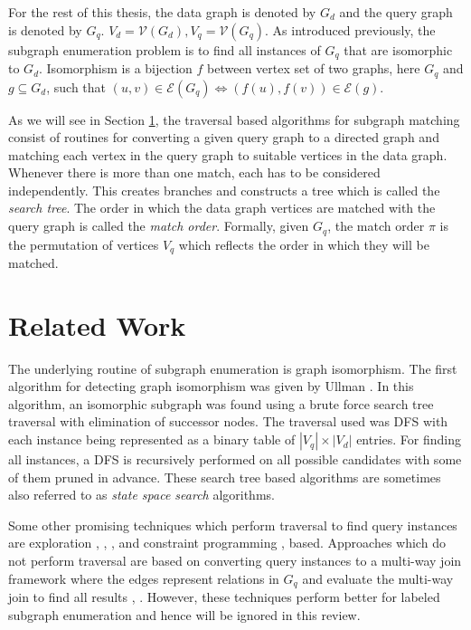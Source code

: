 For the rest of this thesis, the data graph is denoted by $G_d$ and the query graph is denoted by $G_q$. $V_d =  \mathcal{V}(G_d), V_q = \mathcal{V}(G_q)$.
As introduced previously, the subgraph enumeration problem is to find all instances of $G_q$ that are isomorphic to $G_d$.
Isomorphism is a bijection $f$ between vertex set of two graphs, here $G_q$ and $g \subseteq G_d$, such that $ (u,v) \in \mathcal{E}(G_q) \Leftrightarrow (f(u), f(v)) \in \mathcal{E}(g)$.

As we will see in Section \ref{sec:LIT-r}, the traversal based algorithms for subgraph matching consist of routines for converting a given query graph to a directed graph and matching each vertex in the query graph to suitable vertices in the data graph. Whenever there is more than one match, each has to be considered independently.
This creates branches and constructs a tree which is called the \textit{search tree}.
The order in which the data graph vertices are matched with the query graph is called the \textit{match order}.
Formally, given $G_q$, the match order $\pi$ is the permutation of vertices $V_q$ which reflects the order in which they will be matched.

\section{Related Work} \label{sec:LIT-r}
The underlying routine of subgraph enumeration is graph isomorphism.
The first algorithm for detecting graph isomorphism was given by Ullman \cite{ullman_sgm}. In this algorithm, an isomorphic subgraph was found using a brute force search tree traversal with elimination of successor nodes.
The traversal used was DFS with each instance being represented as a binary table of $|V_q|\times |V_d|$ entries.
For finding all instances, a DFS is recursively performed on all possible candidates with some of them pruned in advance.
These search tree based algorithms are sometimes also referred to as \textit{state space search} algorithms.

Some other promising techniques which perform traversal to find query instances are exploration \cite{expl-based1}, \cite{expl-based2}, \cite{expl-based3}, \cite{expl-based4} and constraint programming \cite{cp-based-sgm1}, \cite{cp-based-sgm2} based.
Approaches which do not perform traversal are based on converting query instances to a multi-way join framework where the edges represent relations in $G_q$ and evaluate the multi-way join to find all results \cite{mapreduce}, \cite{mapreduce-dist}.
However, these techniques perform better for labeled subgraph enumeration \cite{sgm-techniques} and hence will be ignored in this review.

